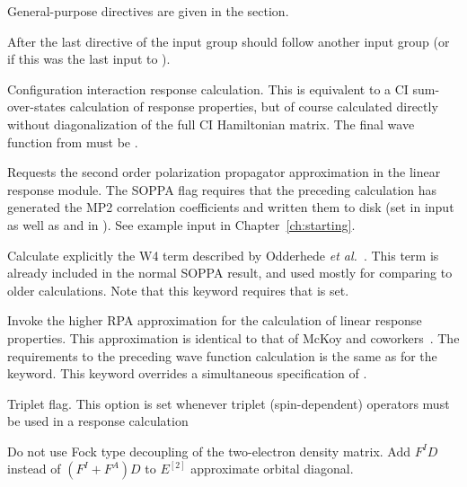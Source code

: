 General-purpose directives are given in the  section.

After the last directive of the  input group
should follow another  input group
(or  if this was the last input to \dalton).

\begin{description}

\item{}
Configuration interaction
response calculation. 
This is equivalent to a CI sum-over-states calculation of response properties,
but of course calculated directly without diagonalization of the full
CI Hamiltonian matrix.
The final wave function from  must be .

\item{}
Requests the second order polarization propagator approximation 
in the linear response module.
The SOPPA
flag requires that
the preceding {\sir} calculation has generated the MP2 correlation
coefficients and written them to disk (set  in 
input as well as  and  in ). See
example input in Chapter~\ref{ch:starting}.

\item{}
Calculate explicitly the W4 term described by Odderhede {\it et
al.\/}~\cite{jopjdlycpr2}. This term is already included in the normal
SOPPA result, and used mostly for comparing to older
calculations. Note that this keyword requires that  is set.

\item{}
Invoke the higher RPA approximation for the calculation of linear
response properties.
This approximation is identical to that of McKoy
and coworkers~\cite{jrtsvmjcp58,tsjrvmjcp58}. The requirements to the
preceding wave function 
calculation is the same as for the  keyword.
This keyword overrides a simultaneous specification of .

\item{}
Triplet flag. This option is set whenever triplet
(spin-dependent)
operators must be used in a response calculation
\cite{jodlypjjcp91,ovhapjhjajthjojcp97}

\item{}
Do not use Fock type decoupling of the two-electron density matrix.
Add $F^ID$ instead of $(F^I+F^A)D$ to $E^{[2]}$ approximate
orbital diagonal. 


\end{description}

